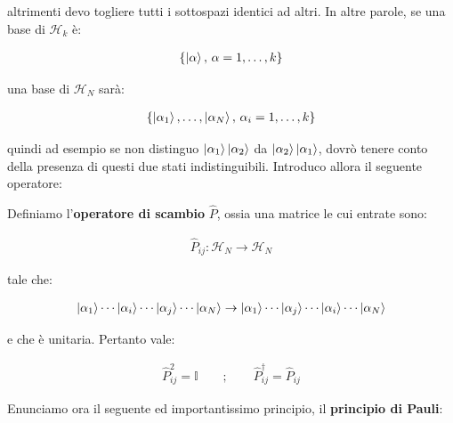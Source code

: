 	altrimenti devo togliere tutti i sottospazi identici ad altri. In altre parole, se una base di $\mathcal{H}_k$ è:
	
\begin{align*}
	\qty{ \ket{\alpha}, \, \alpha = 1, \ldots, k}
\end{align*}

	una base di $\mathcal{H}_N$ sarà:
	
\begin{align*}
	\qty{\ket{\alpha_1}, \ldots, \ket{\alpha_N}, \, \alpha_i = 1, \ldots, k}
\end{align*}
	
	quindi ad esempio se non distinguo $\ket{\alpha_1}\ket{\alpha_2}$ da $\ket{\alpha_2} \ket{\alpha_1}$, dovrò tenere conto della presenza di questi due stati indistinguibili. Introduco allora il seguente operatore:
	
\begin{mydef}	
	Definiamo l'\textbf{operatore di scambio} $\hat{P}$, ossia una matrice le cui entrate sono:
	
\begin{align*}
	\hat{P}_{ij} : \mathcal{H}_N \to \mathcal{H}_N
\end{align*}

	tale che:
	
\begin{align*}
	\ket{\alpha_1} \cdots \ket{\alpha_i} \cdots \ket{\alpha_j} \cdots \ket{\alpha_N} \to \ket{\alpha_1} \cdots \ket{\alpha_j} \cdots \ket{\alpha_i} \cdots \ket{\alpha_N}
\end{align*}

	e che è unitaria. Pertanto vale:

\begin{align*}
	\hat{P}_{ij}^2 = \mathbb{I} \qquad ; \qquad \hat{P}_{ij}^{\dagger} = \hat{P}_{ij}
\end{align*}

\end{mydef}

	Enunciamo ora il seguente ed importantissimo principio, il \textbf{principio di Pauli}:
	
